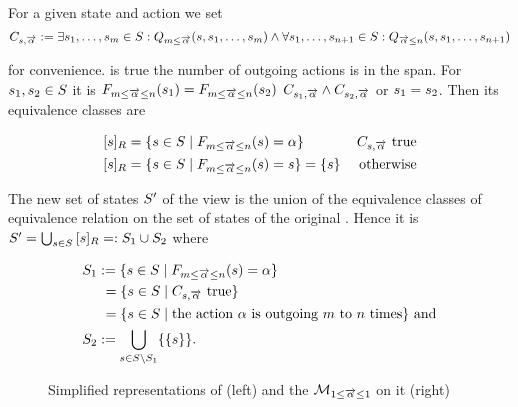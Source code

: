 \documentclass[preview]{standalone}
\begin{document}
For a given state \state and action \action we set
\[
\formoutact:= \exists \state_1, \dots, \state_\numoutactb \in \states: \predminoutact[\numoutactb]\land \\
\forall \state_1, \dots, \state_{\numoutact+1} \in \states: \predmaxoutact
\]

for convenience. \formoutact is true  \iffN the number of outgoing actions is in the span. For $\state_1, \state_2 \in \states$ it is $\gfctspanoutaction(\state_1) = \gfctspanoutaction(\state_2)$ \iffN $\formoutact[\state_1] \land \formoutact[\state_2]$ or $\state_1 = \state_2$. Then its equivalence classes are

\begin{align*}
	\eqclassv &= \{\state \in \states \mid \gfctspanoutaction(\state) = \action\} &\formoutact \text{ true} \\
	\eqclassv &= \{\state \in \states \mid \gfctspanoutaction(\state) = \state\} = \{\state\} &\text{ otherwise}	
\end{align*}

The new set of states $\states'$ of the view \viewspanoutaction is the union of the equivalence classes of equivalence relation \eqrelview on the set of states \states of the original \chgphN. Hence it is $\states' = \bigcup_{\state \in \states} \eqclassv =: \states_1 \cup \states_2$ where

\begin{align*}
	\states_1 &:= \{\state \in \states \mid \gfctspanoutaction(\state) = \action\} \\
	&\hspace{1.15mm}= \{\state \in \states  \mid \formoutact \text{ true}\} \\
	&\hspace{1.15mm}= \{\state \in \states \mid \text{the action } \action \text{ is outgoing } \numoutactb \text{ to } \numoutact \text{ times}\} \text{ and} \\
	\states_2 &:= \remstates.
\end{align*}

\begin{figure}[h]
	\begin{minipage}{.5\textwidth}
		\hspace{5mm}
		
	\end{minipage}%
	\begin{minipage}{.5\textwidth}
		\hspace{5mm}
		
	\end{minipage}
	\caption{Simplified representations of \mdp (left) and the \viewN $\view[\pptyspanoutact{1}{\outact}{1}]$ on it (right)}
	\label{fig:outActSpan}
\end{figure}
\end{document}
